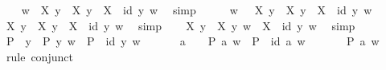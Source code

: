 \begin{isabellebody}
\ \ \isamarkupfalse%
\ {\isachardoublequoteopen}{\isasymexists}w{\isachardot}\ {\isasymnot}{\isacharparenleft}{\isacharparenleft}\ \isactrlbold {\isasymforall}X\ y{\isachardot}\ {\isasymE}\ X\ y\ \isactrlbold {\isasymrightarrow}\ X\ {\isasymRrightarrow}\ id\ y{\isacharparenright}\ w{\isacharparenright}{\isachardoublequoteclose}\ \isamarkupfalse%
\ simp\isanewline
\ \ \isamarkupfalse%
\ \isamarkupfalse%
\ w\ \ {\isachardoublequoteopen}{\isasymnot}{\isacharparenleft}{\isacharparenleft}\ \isactrlbold {\isasymforall}X\ y{\isachardot}\ {\isasymE}\ X\ y\ \isactrlbold {\isasymrightarrow}\ X\ {\isasymRrightarrow}\ id\ y{\isacharparenright}\ w{\isacharparenright}{\isachardoublequoteclose}\ \isacommand{{\isachardot}{\isachardot}}\isamarkupfalse%
\isanewline
\ \ \isamarkupfalse%
\ {\isachardoublequoteopen}{\isacharparenleft}\isactrlbold {\isasymexists}X\ y{\isachardot}\ {\isasymE}\ X\ y\ \isactrlbold {\isasymand}\ \isactrlbold {\isasymnot}{\isacharparenleft}X\ {\isasymRrightarrow}\ id\ y{\isacharparenright}{\isacharparenright}\ w{\isachardoublequoteclose}\ \isamarkupfalse%
\ simp\isanewline
\ \ \isamarkupfalse%
\ {\isachardoublequoteopen}{\isasymexists}X\ y{\isachardot}\ {\isasymE}\ X\ y\ w\ {\isasymand}\ {\isacharparenleft}\isactrlbold {\isasymnot}{\isacharparenleft}X\ {\isasymRrightarrow}\ id\ y{\isacharparenright}{\isacharparenright}\ w{\isachardoublequoteclose}\ \isamarkupfalse%
\ simp\isanewline
\ \ \isamarkupfalse%
\ \isamarkupfalse%
\ P\ \ {\isachardoublequoteopen}{\isasymexists}y{\isachardot}\ {\isasymE}\ P\ y\ w\ {\isasymand}\ {\isacharparenleft}\isactrlbold {\isasymnot}{\isacharparenleft}P\ {\isasymRrightarrow}\ id\ y{\isacharparenright}{\isacharparenright}\ w{\isachardoublequoteclose}\ \isacommand{{\isachardot}{\isachardot}}\isamarkupfalse%
\isanewline
\ \ \isamarkupfalse%
\ \isamarkupfalse%
\ a\ \ {}{\isacharcolon}\ {\isachardoublequoteopen}{\isasymE}\ P\ a\ w\ {\isasymand}\ {\isacharparenleft}\isactrlbold {\isasymnot}{\isacharparenleft}P\ {\isasymRrightarrow}\ id\ a{\isacharparenright}{\isacharparenright}\ w{\isachardoublequoteclose}\ \isacommand{{\isachardot}{\isachardot}}\isamarkupfalse%
\isanewline
\ \ \isamarkupfalse%
\ {}{\isacharcolon}\ {\isachardoublequoteopen}{\isasymE}\ P\ a\ w{\isachardoublequoteclose}\ \isamarkupfalse%
\ {\isacharparenleft}rule\ conjunct{}{\isacharparenright}\isanewline

\end{isabellebody}
